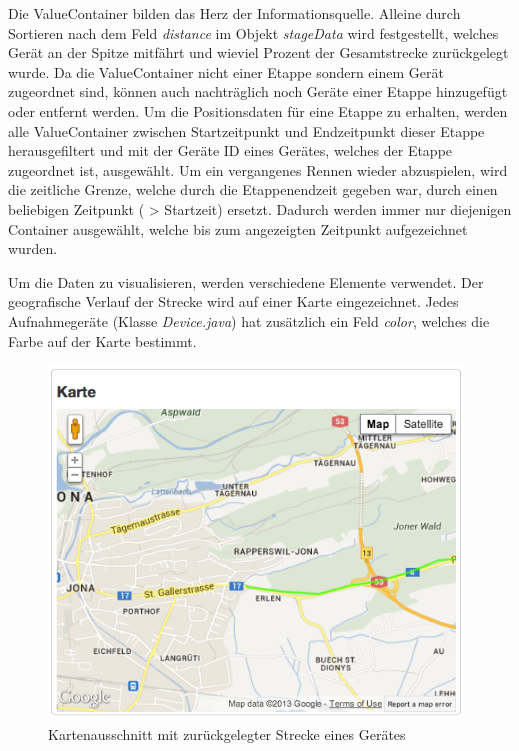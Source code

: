 Die ValueContainer bilden das Herz der Informationsquelle. Alleine durch Sortieren nach dem Feld \textit{distance} im Objekt \textit{stageData} wird festgestellt, welches Gerät an der Spitze mitfährt und wieviel Prozent der Gesamtstrecke zurückgelegt wurde. Da die ValueContainer nicht einer Etappe sondern einem Gerät zugeordnet sind, können auch nachträglich noch Geräte einer Etappe hinzugefügt oder entfernt werden. Um die Positionsdaten für eine Etappe zu erhalten, werden alle ValueContainer zwischen Startzeitpunkt und Endzeitpunkt dieser Etappe herausgefiltert und mit der Geräte ID eines Gerätes, welches der Etappe zugeordnet ist, ausgewählt. Um ein vergangenes Rennen wieder abzuspielen, wird die zeitliche Grenze, welche durch die Etappenendzeit gegeben war, durch einen beliebigen Zeitpunkt ( > Startzeit) ersetzt. Dadurch werden immer nur diejenigen Container ausgewählt, welche bis zum angezeigten Zeitpunkt aufgezeichnet wurden.

Um die Daten zu visualisieren, werden verschiedene Elemente verwendet. Der geografische Verlauf der Strecke wird auf einer Karte eingezeichnet. Jedes Aufnahmegeräte (Klasse \textit{Device.java}) hat zusätzlich ein Feld \textit{color}, welches die Farbe auf der Karte bestimmt.
\begin{figure}[H]
	\centering
	\includegraphics[width=110mm]{images/tourliveweb/karte_neu.png}
	\caption{Kartenausschnitt mit zurückgelegter Strecke eines Gerätes}
\end{figure}


